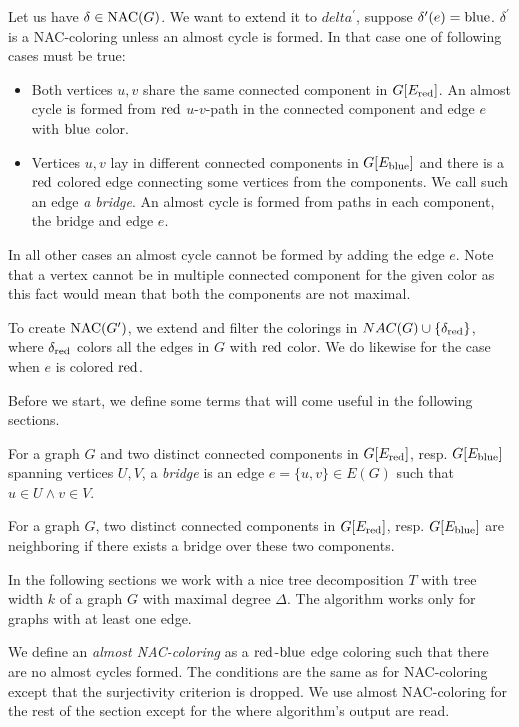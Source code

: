 Let us have \( \delta \in \text{NAC} (G) \).
We want to extend it to \( delta^\prime \), suppose \( \delta^\prime(e) = \text{blue} \).
\( \delta^\prime \) is a NAC-coloring unless an almost cycle is formed.
In that case one of following cases must be true:
%
\begin{itemize}
	\item Both vertices \( u, v \) share the same connected component in \( G[E_\text{red}] \).
	      An almost cycle is formed
	      from \( \text{red} \) \( u \)-\( v \)-path in the connected component
	      and edge \( e \) with \( \text{blue} \) color.
	\item Vertices \( u, v \) lay in different connected components in \( G[E_\text{blue}] \)
	      and there is a \( \text{red} \) colored edge connecting some vertices from the components.
	      We call such an edge \emph{a bridge}.
	      An almost cycle is formed from paths in each component, the bridge and edge \( e \).
\end{itemize}
%
In all other cases an almost cycle cannot be formed by adding the edge \( e \).
Note that a vertex cannot be in multiple connected component for the given color
as this fact would mean that both the components are not maximal.

To create \( \text{NAC} (G^\prime) \), we extend and filter the colorings
in \( NAC(G) \cup \{ \delta_{\text{red}} \} \), where \( \delta_{\text{red}} \)
colors all the edges in \( G \) with \( \text{red} \) color.
We do likewise for the case when \( e \) is colored \( \text{red} \).

Before we start, we define some terms that will come useful in the following sections.
%
\begin{definition}[Bridge]
	For a graph \( G \) and two distinct connected components
	in \( G[E_\text{red}] \), resp. \( G[E_\text{blue}] \)
	spanning vertices \( U, V \),
	a \emph{bridge} is an edge \( e = \{u, v\} \in E(G) \) such that \( u \in U \land v \in V \).
\end{definition}
%
%
\begin{definition}
	For a graph \( G \), two distinct connected components
	in \( G[E_\text{red}] \), resp. \( G[E_\text{blue}] \)
	are neighboring if there exists a bridge over these two components.
\end{definition}
%

In the following sections
we work with a nice tree decomposition \( T \) with tree width \( k \)
of a graph \( G \) with maximal degree \( \Delta \).
The algorithm works only for graphs with at least one edge.

We define an \emph{almost NAC-coloring}
as a \( \text{red} \)-\( \text{blue} \) edge coloring such that there
are no almost cycles formed. The conditions are the same as for NAC-coloring
except that the surjectivity criterion is dropped.
We use almost NAC-coloring for the rest of the section
except for the \RootNode{} where algorithm's output are read.

